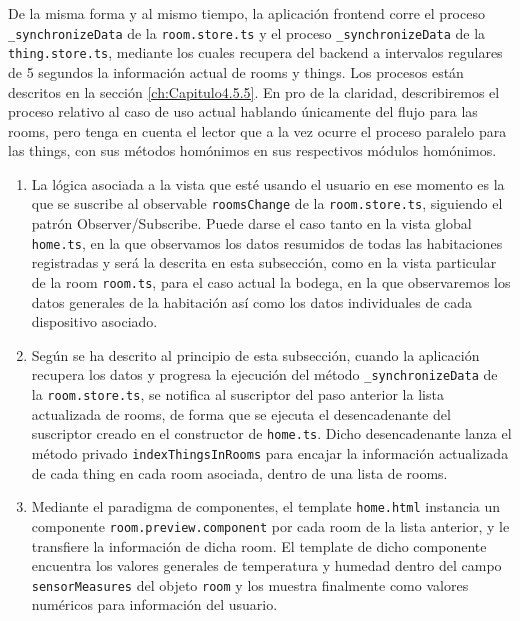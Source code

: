 \vspace{1cm}

De la misma forma y al mismo tiempo, la aplicación frontend corre el proceso \verb|_synchronizeData| de la \verb|room.store.ts| y el proceso \verb|_synchronizeData| de la \verb|thing.store.ts|, mediante los cuales recupera del backend a intervalos regulares de 5 segundos la información actual de rooms y things. Los procesos están descritos en la sección \ref{ch:Capitulo4.5.5}. En pro de la claridad, describiremos el proceso relativo al caso de uso actual hablando únicamente del flujo para las rooms, pero tenga en cuenta el lector que a la vez ocurre el proceso paralelo para las things, con sus métodos homónimos en sus respectivos módulos homónimos.

\begin{enumerate}
\item La lógica asociada a la vista que esté usando el usuario en ese momento es la que se suscribe al observable \verb|roomsChange| de la \verb|room.store.ts|, siguiendo el patrón Observer/Subscribe. Puede darse el caso tanto en la vista global \verb|home.ts|, en la que observamos los datos resumidos de todas las habitaciones registradas y será la descrita en esta subsección, como en la vista particular de la room \verb|room.ts|, para el caso actual la bodega, en la que observaremos los datos generales de la habitación así como los datos individuales de cada dispositivo asociado.
\item Según se ha descrito al principio de esta subsección, cuando la aplicación recupera los datos y progresa la ejecución del método \verb|_synchronizeData| de la \verb|room.store.ts|, se notifica al suscriptor del paso anterior la lista actualizada de rooms, de forma que se ejecuta el desencadenante del suscriptor creado en el constructor de \verb|home.ts|. Dicho desencadenante lanza el método privado \verb|indexThingsInRooms| para encajar la información actualizada de cada thing en cada room asociada, dentro de una lista de rooms.
\item Mediante el paradigma de componentes, el template \verb|home.html| instancia un componente \verb|room.preview.component| por cada room de la lista anterior, y le transfiere la información de dicha room. El template de dicho componente encuentra los valores generales de temperatura y humedad dentro del campo \verb|sensorMeasures| del objeto \verb|room| y los muestra finalmente como valores numéricos para información del usuario.
\end{enumerate}